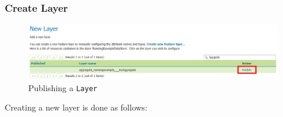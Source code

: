 \pagebreak
\subsubsection{Create Layer}
\begin{figure}[h!]
	\centering
	\vspace{-15pt}
	\includegraphics[width=\textwidth]{Figures/Publishlayer.png}
	\vspace{-5pt}
	\caption{Publishing a \lstinline|Layer|\label{fig:publishlayer}}
\end{figure}
\noindent Creating a new layer is done as follows:
\vspace{10pt}

